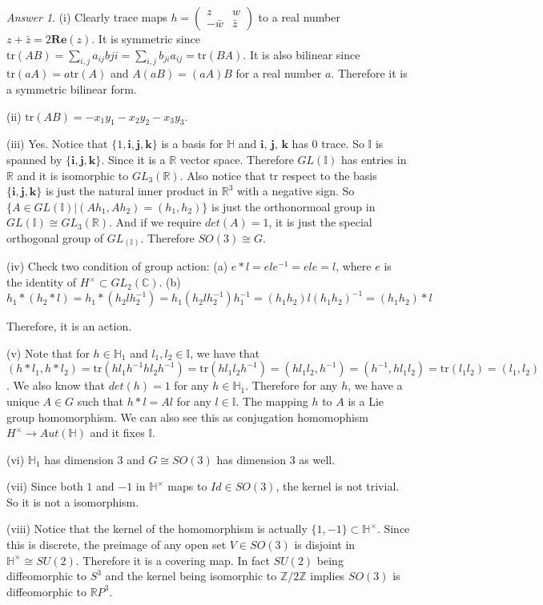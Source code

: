 \documentclass[10pt,a4paper]{article}
\theoremstyle{plain}
\theoremstyle{definition}
\theoremstyle{remark}
\newtheorem*{answer*}{Answer}
\newcommand{\IC}{\mathbb{C}}
\newcommand{\IH}{\mathbb{H}}
\newcommand{\II}{\mathbb{I}}
\newcommand{\IR}{\mathbb{R}}
\newcommand{\IZ}{\mathbb{Z}}
\newcommand{\tr}{\mathrm{tr}}
\newcommand{\<}{\langle}
\renewcommand{\>}{\rangle}
\newcommand{\ra}{\rightarrow}                   %
\newcommand{\isom}{\cong}
\begin{document}
\begin{answer*} \hfill

(i) Clearly trace maps $h = \begin{pmatrix}z & w\\ -\bar{w} & \bar{z}\end{pmatrix}$ to a real number $z+\bar{z} = 2\mathbf{Re}(z)$. It is symmetric since $\tr(AB) = \sum_{i,j} a_{ij}b{ji} = \sum_{i,j} b_{ji}a_{ij} = \tr(BA)$. It is also bilinear since $\tr(aA) = a\tr(A)$ and $A(aB) = (aA)B$ for a real number $a$.
Therefore it is a symmetric bilinear form.

(ii) $\tr(AB) = -x_1y_1-x_2y_2-x_3y_3$.

(iii) Yes. Notice that $\{1, \mathbf{i}, \mathbf{j}, \mathbf{k}\}$ is a basis for $\IH$ and $\mathbf{i},\, \mathbf{j}, \, \mathbf{k}$ has 0 trace. So $\II$ is spanned by $\{\mathbf{i},\mathbf{j},\mathbf{k}\}$. Since it is a $\IR$ vector space. Therefore $GL(\II)$ has entries in $\IR$
and it is isomorphic to $GL_3(\IR)$. Also notice that $\tr$ respect to the basis $\{\mathbf{i},\mathbf{j},\mathbf{k}\}$ is just the natural inner product in $\IR^3$ with a negative sign. So $\{A\in GL(\II) | (Ah_1,Ah_2) = (h_1,h_2)\}$ is just the orthonormoal group in $GL(\II) \isom GL_3(\IR)$. And if we require $det(A) = 1$, it is just the special orthogonal group of $GL_(\II)$.
Therefore $SO(3)\isom G$.

(iv) Check two condition of group action:
(a) $e*l = ele^{-1} = ele = l$, where $e$ is the identity of $H^\times \subset GL_2(\IC)$.
(b) $h_1*(h_2*l) = h_1*(h_2lh_2^{-1}) = h_1(h_2lh_2^{-1})h_1^{-1} = (h_1h_2)l(h_1h_2)^{-1} = (h_1h_2)*l$

Therefore, it is an action.

(v) Note that for $h\in \IH_1$ and $l_1,l_2\in \II$, we have that $(h*l_1,h*l_2) = \tr(hl_1h^{-1}hl_2h^{-1}) = \tr(hl_1l_2h^{-1}) = (hl_1l_2, h^{-1}) = (h^{-1},hl_1l_2) = \tr(l_1l_2) = (l_1,l_2)$. We also know that $det(h) = 1$ for any $h\in \IH_1$.
Therefore for any $h$, we have a unique $A\in G$ such that $h*l = Al$ for any $l\in \II$. The mapping $h$ to $A$ is a Lie group homomorphism. We can also see this as conjugation homomophism $H^\times\ra Aut(\IH)$ and it fixes $\II$.

(vi) $\IH_1$ has dimension $3$ and $G\isom SO(3)$ has dimension $3$ as well.

(vii) Since both $1$ and $-1$ in $\IH^\times$ maps to $Id \in SO(3)$, the kernel is not trivial. So it is not a isomorphism.

(viii) Notice that the kernel of the homomorphism is actually $\{1,-1\}\subset \IH^\times$. Since this is discrete, the preimage of any open set $V\in SO(3)$ is disjoint in $\IH^\times \isom SU(2)$. Therefore it is a covering map. In fact $SU(2)$ being diffeomorphic to $S^3$ and the kernel being isomorphic to $\IZ/2\IZ$ implies $SO(3)$ is diffeomorphic to $\IR P^3$. \\
\end{answer*}
\end{document}
